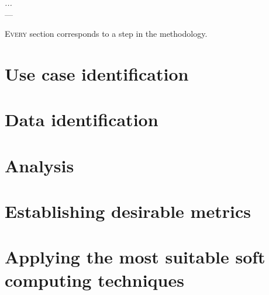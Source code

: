 \label{chap:musesdata}



\begin{flushright}{\slshape
    ...} \\ \medskip
    --- {}
\end{flushright}

\minitoc\mtcskip
\vfill

\lettrine{E}{very} section corresponds to a step in the methodology.


\section{Use case identification}


\section{Data identification}


\section{Analysis}


\section{Establishing desirable metrics}


\section{Applying the most suitable soft computing techniques}